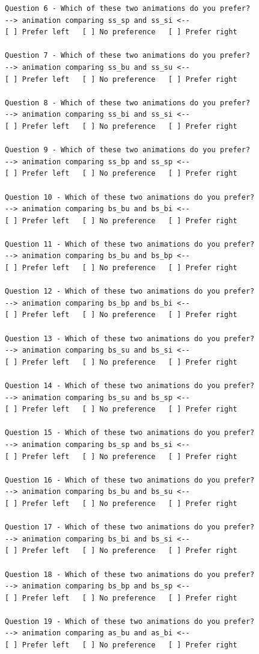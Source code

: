 \documentclass[]{article}
\begin{document}
\begin{Verbatim}[breaklines]
Question 6 - Which of these two animations do you prefer?
--> animation comparing ss_sp and ss_si <--
[ ] Prefer left   [ ] No preference   [ ] Prefer right

Question 7 - Which of these two animations do you prefer?
--> animation comparing ss_bu and ss_su <--
[ ] Prefer left   [ ] No preference   [ ] Prefer right

Question 8 - Which of these two animations do you prefer?
--> animation comparing ss_bi and ss_si <--
[ ] Prefer left   [ ] No preference   [ ] Prefer right

Question 9 - Which of these two animations do you prefer?
--> animation comparing ss_bp and ss_sp <--
[ ] Prefer left   [ ] No preference   [ ] Prefer right

Question 10 - Which of these two animations do you prefer?
--> animation comparing bs_bu and bs_bi <--
[ ] Prefer left   [ ] No preference   [ ] Prefer right

Question 11 - Which of these two animations do you prefer?
--> animation comparing bs_bu and bs_bp <--
[ ] Prefer left   [ ] No preference   [ ] Prefer right

Question 12 - Which of these two animations do you prefer?
--> animation comparing bs_bp and bs_bi <--
[ ] Prefer left   [ ] No preference   [ ] Prefer right

Question 13 - Which of these two animations do you prefer?
--> animation comparing bs_su and bs_si <--
[ ] Prefer left   [ ] No preference   [ ] Prefer right

Question 14 - Which of these two animations do you prefer?
--> animation comparing bs_su and bs_sp <--
[ ] Prefer left   [ ] No preference   [ ] Prefer right

Question 15 - Which of these two animations do you prefer?
--> animation comparing bs_sp and bs_si <--
[ ] Prefer left   [ ] No preference   [ ] Prefer right

Question 16 - Which of these two animations do you prefer?
--> animation comparing bs_bu and bs_su <--
[ ] Prefer left   [ ] No preference   [ ] Prefer right

Question 17 - Which of these two animations do you prefer?
--> animation comparing bs_bi and bs_si <--
[ ] Prefer left   [ ] No preference   [ ] Prefer right

Question 18 - Which of these two animations do you prefer?
--> animation comparing bs_bp and bs_sp <--
[ ] Prefer left   [ ] No preference   [ ] Prefer right

Question 19 - Which of these two animations do you prefer?
--> animation comparing as_bu and as_bi <--
[ ] Prefer left   [ ] No preference   [ ] Prefer right


\end{Verbatim}
\end{document}
